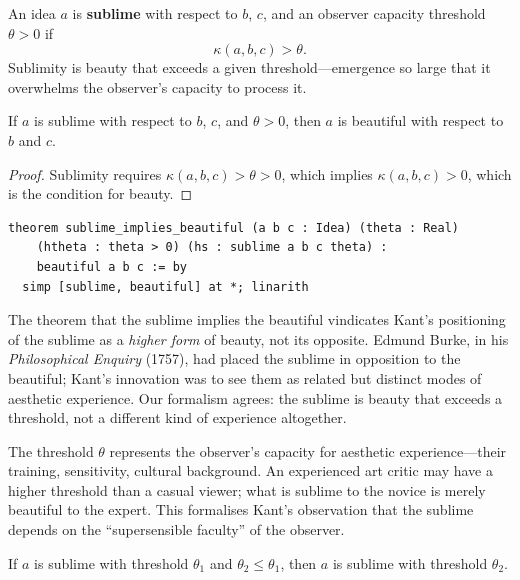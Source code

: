 \begin{definition}
\label{def:sublime}
An idea $a$ is \textbf{sublime} with respect to $b$, $c$, and an
observer capacity threshold $\theta > 0$ if
\[
  \kappa(a, b, c) > \theta.
\]
Sublimity is beauty that exceeds a given threshold---emergence so
large that it overwhelms the observer's capacity to process it.
\end{definition}

\begin{theorem}
\label{thm:sublime-implies-beautiful}
If $a$ is sublime with respect to $b$, $c$, and $\theta > 0$, then
$a$ is beautiful with respect to $b$ and $c$.
\end{theorem}

\begin{proof}
Sublimity requires $\kappa(a, b, c) > \theta > 0$, which implies
$\kappa(a, b, c) > 0$, which is the condition for beauty.
\end{proof}

\begin{lstlisting}
theorem sublime_implies_beautiful (a b c : Idea) (theta : Real)
    (htheta : theta > 0) (hs : sublime a b c theta) :
    beautiful a b c := by
  simp [sublime, beautiful] at *; linarith
\end{lstlisting}

\begin{interpretation}
\label{int:sublime-kant-burke}
The theorem that the sublime implies the beautiful vindicates Kant's
positioning of the sublime as a \emph{higher form} of beauty, not its
opposite.  Edmund Burke, in his \emph{Philosophical Enquiry} (1757),
had placed the sublime in opposition to the beautiful; Kant's innovation
was to see them as related but distinct modes of aesthetic experience.
Our formalism agrees: the sublime is beauty that exceeds a threshold,
not a different kind of experience altogether.

The threshold $\theta$ represents the observer's capacity for aesthetic
experience---their training, sensitivity, cultural background.  An
experienced art critic may have a higher threshold than a casual viewer;
what is sublime to the novice is merely beautiful to the expert.  This
formalises Kant's observation that the sublime depends on the
``supersensible faculty'' of the observer.
\end{interpretation}

\begin{theorem}
\label{thm:sublime-threshold-mono}
If $a$ is sublime with threshold $\theta_1$ and $\theta_2 \leq \theta_1$,
then $a$ is sublime with threshold $\theta_2$.
\end{theorem}


